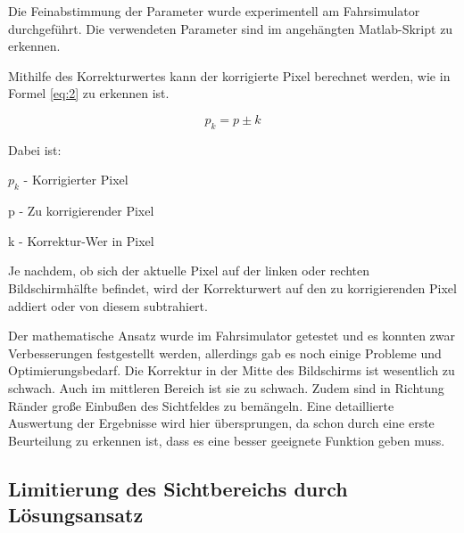 Die Feinabstimmung der Parameter wurde experimentell am Fahrsimulator durchgeführt. Die verwendeten Parameter sind im angehängten Matlab-Skript zu erkennen. 

Mithilfe des Korrekturwertes kann der korrigierte Pixel berechnet werden, wie in Formel \ref{eq:2} zu erkennen ist.  

\begin{equation} \label{eq:2}
	p_{k} =  p \pm k
\end{equation}

Dabei ist: 
\begin{center}
	$p_{k}$ - Korrigierter Pixel \par
	p - Zu korrigierender Pixel \par
	k - Korrektur-Wer in Pixel\par
\end{center}

Je nachdem, ob sich der aktuelle Pixel auf der linken oder rechten Bildschirmhälfte befindet, wird der Korrekturwert auf den zu korrigierenden Pixel addiert oder von diesem subtrahiert. 


Der mathematische Ansatz wurde im Fahrsimulator getestet und es konnten zwar Verbesserungen festgestellt werden, allerdings gab es noch einige Probleme und Optimierungsbedarf. Die Korrektur in der Mitte des Bildschirms ist wesentlich zu schwach. Auch im mittleren Bereich ist sie zu schwach. Zudem sind in Richtung Ränder große Einbußen des Sichtfeldes zu bemängeln. Eine detaillierte Auswertung der Ergebnisse wird hier übersprungen, da schon durch eine erste Beurteilung zu erkennen ist, dass es eine besser geeignete Funktion geben muss. 

\subsection{Limitierung des Sichtbereichs durch Lösungsansatz}


